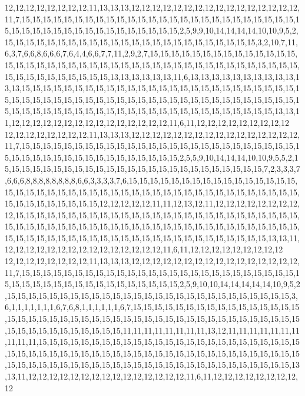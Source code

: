 12,12,12,12,12,12,12,12,11,13,13,13,12,12,12,12,12,12,12,12,12,12,12,12,12,12,12,12,11,7,15,15,15,15,15,15,15,15,15,15,15,15,15,15,15,15,15,15,15,15,15,15,15,15,15,15,15,15,15,15,15,15,15,15,15,15,15,15,15,15,15,15,15,2,5,9,9,10,14,14,14,14,10,10,9,5,2,15,15,15,15,15,15,15,15,15,15,15,15,15,15,15,15,15,15,15,15,15,15,15,15,3,2,10,7,11,6,3,7,6,6,8,6,6,6,7,6,4,4,6,6,7,7,11,2,9,2,7,15,15,15,15,15,15,15,15,15,15,15,15,15,15,15,15,15,15,15,15,15,15,15,15,15,15,15,15,15,15,15,15,15,15,15,15,15,15,15,15,15,15,15,15,15,15,15,15,15,15,15,15,13,13,13,13,13,13,11,6,13,13,13,13,13,13,13,13,13,13,13,13,15,15,15,15,15,15,15,15,15,15,15,15,15,15,15,15,15,15,15,15,15,15,15,15,15,15,15,15,15,15,15,15,15,15,15,15,15,15,15,15,15,15,15,15,15,15,15,15,15,15,15,15,15,15,15,15,15,15,15,15,15,15,15,15,15,15,15,15,15,15,15,15,15,15,15,15,15,15,15,15,13,13,11,12,12,12,12,12,12,12,12,12,12,12,12,12,12,12,11,6,11,12,12,12,12,12,12,12,12,12
12,12,12,12,12,12,12,12,11,13,13,13,12,12,12,12,12,12,12,12,12,12,12,12,12,12,12,12,11,7,15,15,15,15,15,15,15,15,15,15,15,15,15,15,15,15,15,15,15,15,15,15,15,15,15,15,15,15,15,15,15,15,15,15,15,15,15,15,15,15,15,15,15,2,5,5,9,10,14,14,14,10,10,9,5,5,2,15,15,15,15,15,15,15,15,15,15,15,15,15,15,15,15,15,15,15,15,15,15,15,15,15,7,2,3,3,3,7,6,6,6,8,8,8,8,8,8,8,8,6,6,3,3,3,3,7,6,15,15,15,15,15,15,15,15,15,15,15,15,15,15,15,15,15,15,15,15,15,15,15,15,15,15,15,15,15,15,15,15,15,15,15,15,15,15,15,15,15,15,15,15,15,15,15,15,15,15,15,15,15,12,12,12,12,12,11,11,12,13,12,11,12,12,12,12,12,12,12,12,12,15,15,15,15,15,15,15,15,15,15,15,15,15,15,15,15,15,15,15,15,15,15,15,15,15,15,15,15,15,15,15,15,15,15,15,15,15,15,15,15,15,15,15,15,15,15,15,15,15,15,15,15,15,15,15,15,15,15,15,15,15,15,15,15,15,15,15,15,15,15,15,15,15,15,15,15,15,15,15,15,13,13,11,12,12,12,12,12,12,12,12,12,12,12,12,12,12,12,11,6,11,12,12,12,12,12,12,12,12,12
12,12,12,12,12,12,12,12,11,13,13,13,12,12,12,12,12,12,12,12,12,12,12,12,12,12,12,12,11,7,15,15,15,15,15,15,15,15,15,15,15,15,15,15,15,15,15,15,15,15,15,15,15,15,15,15,15,15,15,15,15,15,15,15,15,15,15,15,15,15,15,15,15,2,5,9,10,10,14,14,14,14,14,10,9,5,2,15,15,15,15,15,15,15,15,15,15,15,15,15,15,15,15,15,15,15,15,15,15,15,15,15,15,15,3,6,1,1,1,1,1,1,1,6,7,6,8,1,1,1,1,1,1,6,7,15,15,15,15,15,15,15,15,15,15,15,15,15,15,15,15,15,15,15,15,15,15,15,15,15,15,15,15,15,15,15,15,15,15,15,15,15,15,15,15,15,15,15,15,15,15,15,15,15,15,15,15,15,15,15,11,11,11,11,11,11,11,11,13,12,11,11,11,11,11,11,11,11,11,11,15,15,15,15,15,15,15,15,15,15,15,15,15,15,15,15,15,15,15,15,15,15,15,15,15,15,15,15,15,15,15,15,15,15,15,15,15,15,15,15,15,15,15,15,15,15,15,15,15,15,15,15,15,15,15,15,15,15,15,15,15,15,15,15,15,15,15,15,15,15,15,15,15,15,15,15,15,15,15,15,13,13,11,12,12,12,12,12,12,12,12,12,12,12,12,12,12,12,11,6,11,12,12,12,12,12,12,12,12,12
